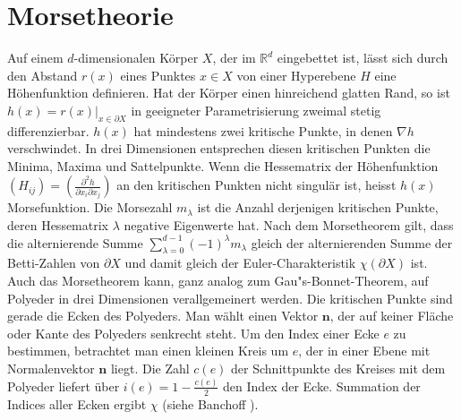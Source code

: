 \section{Morsetheorie}
Auf einem $d$-dimensionalen K\"orper $X$, der im $\mathbb{R}^d$ eingebettet ist, l\"asst sich durch den Abstand $r(x)$ eines Punktes $x\in X$ von einer Hyperebene $H$ eine H\"ohenfunktion definieren. Hat der K\"orper einen hinreichend glatten Rand, so ist $h(x)=r(x)|_{x\in \partial X}$ in geeigneter Parametrisierung zweimal stetig differenzierbar. $h(x)$ hat mindestens zwei kritische Punkte, in denen $\nabla h$ verschwindet. In drei Dimensionen entsprechen diesen kritischen Punkten die Minima, Maxima und Sattelpunkte. Wenn die Hessematrix der H\"ohenfunktion $\left(H_{ij}\right)=\left(\frac{\partial^2 h}{\partial x_i \partial x_j}\right)$ an den kritischen Punkten nicht singul\"ar ist, heisst $h(x)$ Morsefunktion. Die Morsezahl $m_\lambda$ ist die Anzahl derjenigen kritischen Punkte, deren Hessematrix $\lambda$ negative Eigenwerte hat. Nach dem Morsetheorem \cite{Milnor:68} gilt, dass die alternierende Summe $\sum_{\lambda=0}^{d-1} (-1)^\lambda m_\lambda$ gleich der alternierenden Summe der Betti-Zahlen von $\partial X$ und damit gleich der Euler-Charakteristik $\chi(\partial X)$ ist.\\
Auch das Morsetheorem kann, ganz analog zum Gau"s-Bonnet-Theorem, auf Polyeder in drei Dimensionen verallgemeinert werden. Die kritischen Punkte sind gerade die Ecken des Polyeders. Man w\"ahlt einen Vektor $\mathbf{n}$, der auf keiner Fl\"ache oder Kante des Polyeders senkrecht steht. Um den Index einer Ecke $e$ zu bestimmen, betrachtet man einen kleinen Kreis um $e$, der in einer Ebene mit Normalenvektor $\mathbf{n}$ liegt. Die Zahl $c(e)$ der Schnittpunkte des Kreises mit dem Polyeder liefert \"uber $i(e)=1-\frac{c(e)}{2}$ den Index der Ecke. Summation der Indices aller Ecken ergibt $\chi$ (siehe Banchoff \cite{Banchoff:70}). 

